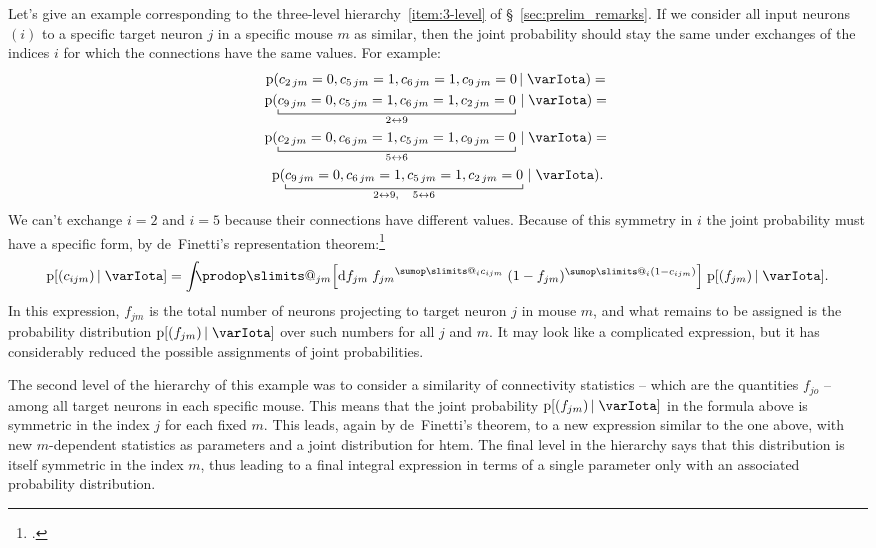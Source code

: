 \documentclass[\ifafour a4paper,12pt,\else a5paper,10pt,\fi%
onecolumn,oneside,article,%
british%
]{memoir}
\makeatletter
\theoremstyle{remark}
\theoremstyle{innote}
\def\sum{\DOTSI\sumop\slimits@}
\def\prod{\DOTSI\prodop\slimits@}
\newcommand*{\citep}{\footcites}
\newcommand*{\di}{\mathrm{d}}%
\newcommand*{\pf}{\mathrm{p}}%
\renewcommand*{\|}[1][]{\nonscript\,#1\vert\nonscript\;\mathopen{}}
\newcommand*{\sect}{\S}%
\newcommand*{\yI}{\varIota}
\newcommand*{\yc}{c}
\makeatother
\begin{document}
Let's give an example corresponding to the three-level
hierarchy~\ref{item:3-level} of \sect~\ref{sec:prelim_remarks}. If we
consider all input neurons $(i)$ to a specific target neuron $j$ in a
specific mouse $m$ as similar, then the joint probability should stay the
same under exchanges of the indices $i$ for which the connections have the
same values. For example:
\begin{multline}
  \label{eq:example_exchange_i}
  \pf(\yc_{2\,jm}=0, \yc_{5\,jm}=1, \yc_{6\,jm}=1, \yc_{9\,jm}=0 \| \yI) ={}\\
  \pf(\underbracket[0.5pt]{\yc_{9\,jm}=0, \yc_{5\,jm}=1, \yc_{6\,jm}=1, \yc_{2\,jm}=0}_{2\leftrightarrow 9} \| \yI) ={}\\
  \pf(\underbracket[0.5pt]{\yc_{2\,jm}=0, \yc_{6\,jm}=1, \yc_{5\,jm}=1, \yc_{9\,jm}=0}_{5\leftrightarrow 6} \| \yI) ={}\\
  \pf(\underbracket[0.5pt]{\yc_{9\,jm}=0, \yc_{6\,jm}=1, \yc_{5\,jm}=1, \yc_{2\,jm}=0}_{2\leftrightarrow 9,\quad 5\leftrightarrow 6} \| \yI).
\end{multline}
We can't exchange $i=2$ and $i=5$ because their connections have different
values. Because of this symmetry in $i$ the joint probability must have a
specific form, by de~Finetti's representation
theorem:\citep{definetti1930,hewittetal1955,heathetal1976,diaconis1977,diaconisetal1980,dawid2013}
\begin{equation}
  \label{eq:definetti_example_i}
  \pf[(\yc_{ijm}) \| \yI] =
  \int\!\!\!\prod_{jm}\Bigl[\di f_{jm}\;
  {f_{jm}}^{\sum_{i}\yc_{ijm}}\;(1-f_{jm})^{\sum_{i}(1-\yc_{ijm})}\Bigr]\;
  \pf[(f_{jm}) \| \yI].
\end{equation}
In this expression, $f_{jm}$ is the total number of neurons projecting to
target neuron $j$ in mouse $m$, and what remains to be assigned is the
probability distribution $\pf[(f_{jm}) \| \yI]$ over such numbers for all
$j$ and $m$. It may look like a complicated expression, but it has
considerably reduced the possible assignments of joint probabilities.

The second level of the hierarchy of this example was to consider a
similarity of connectivity statistics -- which are the quantities $f_{jo}$
-- among all target neurons in each specific mouse. This means that the
joint probability $\pf[(f_{jm}) \| \yI]$ in the formula above is symmetric
in the index $j$ for each fixed $m$. This leads, again by de~Finetti's
theorem, to a new expression similar to the one above, with new
$m$-dependent statistics as parameters and a joint distribution for htem.
The final level in the hierarchy says that this distribution is itself
symmetric in the index $m$, thus leading to a final integral expression in
terms of a single parameter only with an associated probability
distribution.
\end{document}
